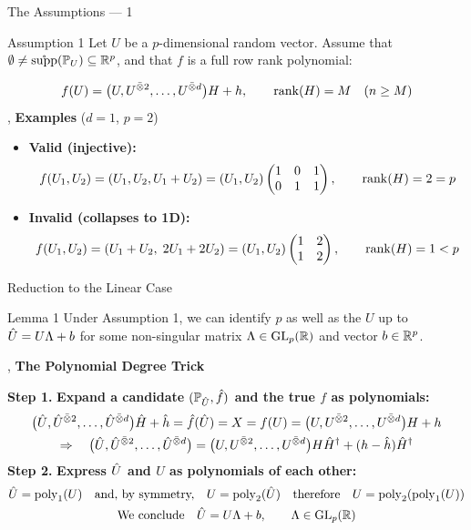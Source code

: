 \begin{frame}{The Assumptions --- 1}
  \vspace{1ex}
  \begin{statement}{Assumption 1}
    Let $U$ be a $p$-dimensional random vector. Assume that $\emptyset \neq \mathring{\operatorname{supp}}(\mathbb{P}_U) \subseteq \mathbb{R}^p$, and that $f$ is a full row rank polynomial:
  \end{statement}
  \[
    f(U) = \big(U, U^{\mathbin{\bar{\otimes}} 2},\dots,U^{\mathbin{\bar{\otimes}} d}\big) H + h, \qquad \operatorname{rank}(H) = M \quad (n \geq M)
  \]
  \sep
  \textbf{Examples} ($d = 1$, $p = 2$)
  \begin{itemize}
    \item \textbf{Valid (injective):}
      \[ f(U_1,U_2) = (U_1, U_2, U_1 + U_2) = (U_1,U_2)\begin{pmatrix} 1 & 0 & 1 \\ 0 & 1 & 1 \end{pmatrix}, \qquad \operatorname{rank}(H) = 2 = p \]
    \item \textbf{Invalid (collapses to 1D):}
      \[ f(U_1,U_2) = (U_1 + U_2,\; 2U_1 + 2U_2) = (U_1,U_2)\begin{pmatrix} 1 & 2 \\ 1 & 2 \end{pmatrix}, \qquad \operatorname{rank}(H) = 1 < p \]
  \end{itemize}
\end{frame}

\begin{frame}{Reduction to the Linear Case}
  \vspace{1ex}
  \begin{statement}{Lemma 1}
    Under Assumption 1, we can identify $p$ as well as the $U$ up to $\hat{U} = U\Lambda + b$ for some non-singular matrix $\Lambda \in \operatorname{GL}_p(\mathbb{R})$ and vector $b \in \mathbb{R}^p$.
  \end{statement}
  \sep
  \textbf{The Polynomial Degree Trick}\par\smallskip
  \textbf{Step 1.} \textbf{Expand a candidate $(\mathbb{P}_{\hat{U}}, \hat f)$ and the true $f$ as polynomials:}
  \begin{gather*}
    \big(\hat{U}, \hat{U}^{\mathbin{\bar{\otimes}} 2},\dots,\hat{U}^{\mathbin{\bar{\otimes}} d}\big)\hat H + \hat h = \hat f(\hat{U}) = X = f(U) = \big(U, U^{\mathbin{\bar{\otimes}} 2},\dots,U^{\mathbin{\bar{\otimes}} d}\big) H + h \\
    \Rightarrow\quad \big(\hat{U}, \hat{U}^{\mathbin{\bar{\otimes}} 2},\dots,\hat{U}^{\mathbin{\bar{\otimes}} d}\big) = \big(U, U^{\mathbin{\bar{\otimes}} 2},\dots,U^{\mathbin{\bar{\otimes}} d}\big) H \hat H^{\dagger} + (h - \hat h)\hat H^{\dagger}
  \end{gather*}
  \textbf{Step 2.} \textbf{Express $\hat{U}$ and $U$ as polynomials of each other:}
  \begin{gather*}
    \hat{U} = \operatorname{poly}_1(U) \quad\text{and, by symmetry,}\quad U = \operatorname{poly}_2(\hat{U}) \quad\text{therefore}\quad U = \operatorname{poly}_2(\operatorname{poly}_1(U)) \\
    \text{We conclude}\quad \hat{U} = U\Lambda + b, \qquad \Lambda \in \operatorname{GL}_p(\mathbb{R})
  \end{gather*}
\end{frame}

